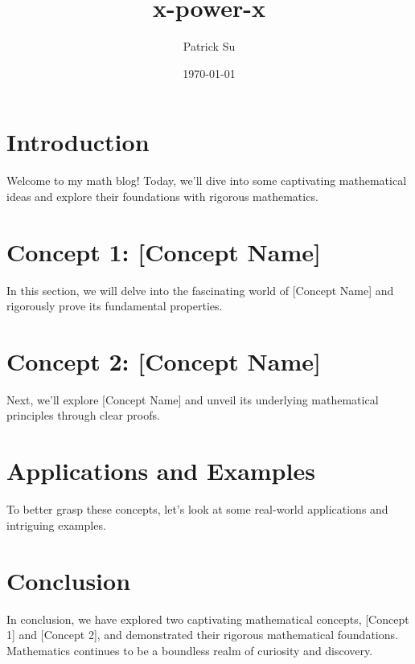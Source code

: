 \documentclass[12pt]{article}
\title{x-power-x}
\author{Patrick Su}
\date{\today}
\begin{document}
\maketitle

\begin{abstract}

\end{abstract}

\section{Introduction}
Welcome to my math blog! Today, we'll dive into some captivating mathematical ideas and explore their foundations with rigorous mathematics.

\section{Concept 1: [Concept Name]}
In this section, we will delve into the fascinating world of [Concept Name] and rigorously prove its fundamental properties.

\section{Concept 2: [Concept Name]}
Next, we'll explore [Concept Name] and unveil its underlying mathematical principles through clear proofs.

\section{Applications and Examples}
To better grasp these concepts, let's look at some real-world applications and intriguing examples.

\section{Conclusion}
In conclusion, we have explored two captivating mathematical concepts, [Concept 1] and [Concept 2], and demonstrated their rigorous mathematical foundations. Mathematics continues to be a boundless realm of curiosity and discovery.

\end{document}
